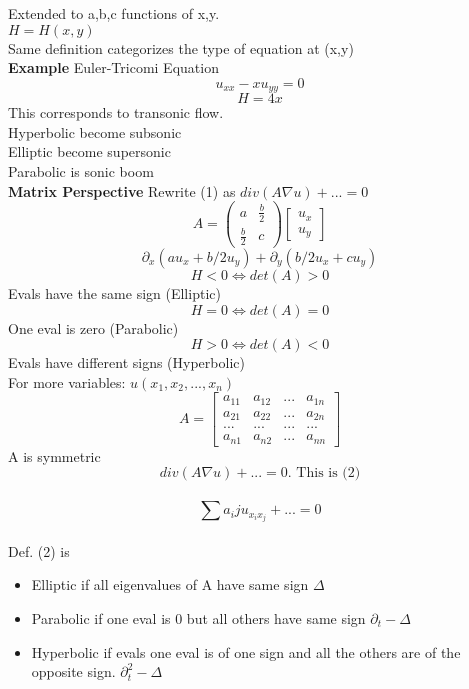 \documentclass{article}
\begin{document}
Extended to a,b,c functions of x,y.\\
$H = H(x,y)$\\
Same definition categorizes the type of equation at (x,y)\\
\textbf{Example} Euler-Tricomi Equation
$$u_{xx} - x u_{yy} = 0$$
$$H = 4x$$
This corresponds to transonic flow.\\
Hyperbolic become subsonic\\
Elliptic become supersonic\\
Parabolic is sonic boom\\
\textbf{Matrix Perspective}
Rewrite (1) as $div(A \nabla u) + ... = 0$\\
$$A = \begin{pmatrix}
    a & \frac{b}{2}\\
    \frac{b}{2} & c
\end{pmatrix} \begin{bmatrix}
    u_{x}\\
    u_{y}
\end{bmatrix}$$
$$ \partial_x (au_x + b/2 u_y) + \partial_y (b/2 u_x + cu_y)$$
$$H < 0  \Leftrightarrow det(A) > 0$$
Evals have the same sign (Elliptic)
$$H = 0 \Leftrightarrow det(A) = 0$$
One eval is zero (Parabolic)
$$H > 0 \Leftrightarrow det(A) < 0$$
Evals have different signs (Hyperbolic)\\
For more variables: $u(x_1,x_2,...,x_n)$\\
$$ A = \begin{bmatrix}
    a_{11} & a_{12} & ... & a_{1n}\\
    a_{21} & a_{22} & ... & a_{2n}\\
    ... & ... & ... & ...\\
    a_{n1} & a_{n2} & ... & a_{nn}
\end{bmatrix}$$
A is symmetric\\
$$div(A \nabla u) + ... = 0. \text{ This is (2)}$$\\
$$\sum a_ij u_{x_ix_j} + ... = 0$$\\
Def. (2) is 
\begin{itemize}
    \item Elliptic if all eigenvalues of A have same sign $\Delta$
    \item Parabolic if one eval is 0 but all others have same sign $\partial_t - \Delta$ 
    \item Hyperbolic if evals one eval is of one sign and all the others are of the opposite sign. $\partial_t^2 - \Delta$
\end{itemize}
\end{document}
